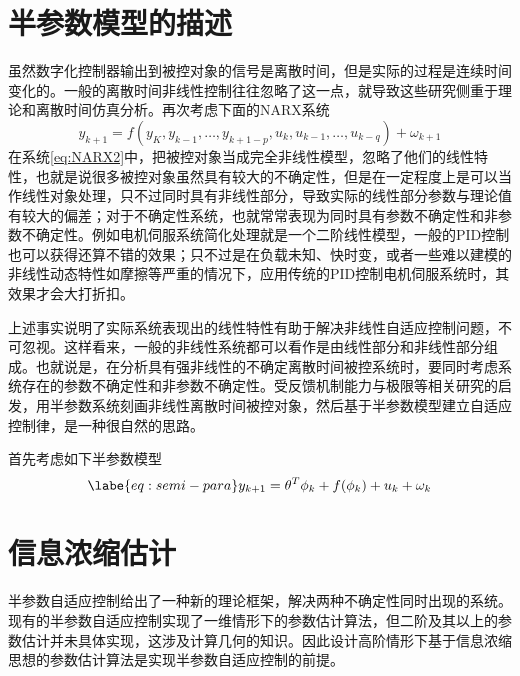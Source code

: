 \section{半参数模型的描述}
\label{sect:2.2}
虽然数字化控制器输出到被控对象的信号是离散时间，但是实际的过程是连续时间变化的。一般的离散时间非线性控制往往忽略了这一点，就导致这些研究侧重于理论和离散时间仿真分析。再次考虑下面的NARX系统
\begin{equation}%
\label{eq:NARX2}
y_{k+1} = f(y_{K},y_{k-1},\ldots,y_{k+1-p},u_{k},u_{k-1},\ldots,u_{k-q})+\omega_{k+1}
\end{equation}
在系统\eqref{eq:NARX2}中，把被控对象当成完全非线性模型，忽略了他们的线性特性，也就是说很多被控对象虽然具有较大的不确定性，但是在一定程度上是可以当作线性对象处理，只不过同时具有非线性部分，导致实际的线性部分参数与理论值有较大的偏差；对于不确定性系统，也就常常表现为同时具有参数不确定性和非参数不确定性。例如电机伺服系统简化处理就是一个二阶线性模型，一般的PID控制也可以获得还算不错的效果；只不过是在负载未知、快时变，或者一些难以建模的非线性动态特性如摩擦等严重的情况下，应用传统的PID控制电机伺服系统时，其效果才会大打折扣。

上述事实说明了实际系统表现出的线性特性有助于解决非线性自适应控制问题，不可忽视。这样看来，一般的非线性系统都可以看作是由线性部分和非线性部分组成。也就说是，在分析具有强非线性的不确定离散时间被控系统时，要同时考虑系统存在的参数不确定性和非参数不确定性。受反馈机制能力与极限等相关研究的启发，用半参数系统刻画非线性离散时间被控对象，然后基于半参数模型建立自适应控制律，是一种很自然的思路。

首先考虑如下半参数模型
\begin{equation}%
\labe{eq:semi-para}
y_{k+1} = \theta^{T}\phi_{k}+f(\phi_{k})+ u_{k} +\omega_{k}
\end{equation}

\section{信息浓缩估计}
\label{sect:2.3}
半参数自适应控制给出了一种新的理论框架，解决两种不确定性同时出现的系统。现有的半参数自适应控制实现了一维情形下的参数估计算法，但二阶及其以上的参数估计并未具体实现，这涉及计算几何的知识。因此设计高阶情形下基于信息浓缩思想的参数估计算法是实现半参数自适应控制的前提。
